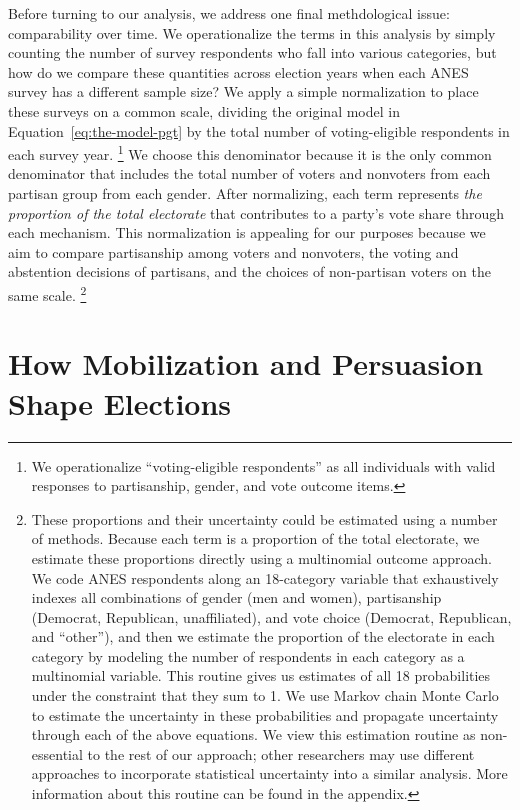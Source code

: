 \documentclass[12pt
               ,final
               ]{article}
\begin{document}
Before turning to our analysis, we address one final methdological issue: comparability over time. We operationalize the terms in this analysis by simply counting the number of survey respondents who fall into various categories, but how do we compare these quantities across election years when each ANES survey has a different sample size? We apply a simple normalization to place these surveys on a common scale, dividing the original model in Equation~\ref{eq:the-model-pgt} by the total number of voting-eligible respondents in each survey year.%
  \footnote{We operationalize ``voting-eligible respondents'' as all individuals with valid responses to partisanship, gender, and vote outcome items.}
We choose this denominator because it is the only common denominator that includes the total number of voters and nonvoters from each partisan group from each gender. After normalizing, each term represents \emph{the proportion of the total electorate} that contributes to a party's vote share through each mechanism. This normalization is appealing for our purposes because we aim to compare partisanship among voters and nonvoters, the voting and abstention decisions of partisans, and the choices of non-partisan voters on the same scale.%
  \footnote{These proportions and their uncertainty could be estimated using a number of methods. Because each term is a proportion of the total electorate, we estimate these proportions directly using a multinomial outcome approach. We code ANES respondents along an 18-category variable that exhaustively indexes all combinations of gender (men and women), partisanship (Democrat, Republican, unaffiliated), and vote choice (Democrat, Republican, and ``other''), and then we estimate the proportion of the electorate in each category by modeling the number of respondents in each category as a multinomial variable. This routine gives us estimates of all 18 probabilities under the constraint that they sum to 1. We use Markov chain Monte Carlo to estimate the uncertainty in these probabilities and propagate uncertainty through each of the above equations. We view this estimation routine as non-essential to the rest of our approach; other researchers may use different approaches to incorporate statistical uncertainty into a similar analysis. More information about this routine can be found in the appendix.}


\section*{How Mobilization and Persuasion Shape Elections}
\end{document}
